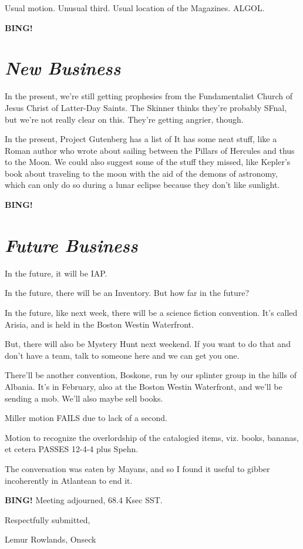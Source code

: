\documentclass[10pt]{article}
\newcommand{\bing}{{\bf BING!} }
\newcommand{\goto}[1]{\bing \vskip 12pt \section*{{\em{#1}}}}
\newcommand{\ps}{ plus Spehn\xspace}
\newcommand{\onseck}{Lemur Rowlands, Onseck}
\begin{document}
Usual motion.  Unusual third.  Usual location of the Magazines.  ALGOL.


\goto{New Business}

In the present, we're still getting prophesies from the Fundamentalist Church
of Jesus Christ of Latter-Day Saints.  The Skinner thinks they're probably SFnal,
but we're not really clear on this.  They're getting angrier, though.

In the present, Project Gutenberg has a list of 
It has some neat stuff, like a Roman author who wrote about sailing between the Pillars
of Hercules and thus to the Moon.  We could also suggest some of the stuff they
missed, like Kepler's book about traveling to the moon with the aid of the demons
of astronomy, which can only do so during a lunar eclipse because they don't like
sunlight.

\goto{Future Business}

In the future, it will be IAP.

In the future, there will be an Inventory.  But how far in the future? 

In the future, like next week, there will be a science fiction convention.  It's
called Arisia, and is held in the Boston Westin Waterfront.

But, there will also be Mystery Hunt next weekend.  If you want to do that and don't
have a team, talk to someone here and we can get you one.

There'll be another convention, Boskone, run by our splinter group in the hills of
Albania.  It's in February, also at the Boston Westin Waterfront, and we'll be
sending a mob.  We'll also maybe sell books.

Miller motion FAILS due to lack of a second.

Motion to recognize the overlordship of the catalogied items, viz. books, bananas, et
cetera PASSES 12-4-4\ps.

The conversation was eaten by Mayans, and so I found it useful to gibber incoherently
in Atlantean to end it.

\bing
\noindent
Meeting adjourned, 68.4 Ksec SST.

\vspace{18pt}

\centerline{Respectfully submitted,}
\centerline{\onseck}
\end{document}
